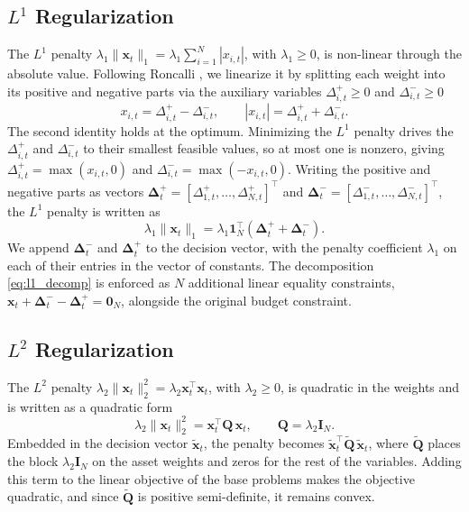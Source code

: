 \subsection{$L^1$ Regularization} \label{app:l1}

The $L^1$ penalty $\lambda_1 \|\bm{x}_t\|_1 = \lambda_1 \sum_{i=1}^N |x_{i,t}|$, with
$\lambda_1 \ge 0$, is non-linear through the absolute value. Following Roncalli \cite{roncalli2013introduction},
we linearize it by splitting each weight into its positive and negative parts via the
auxiliary variables $\Delta_{i,t}^+ \ge 0$ and $\Delta_{i,t}^- \ge 0$
\begin{equation} \label{eq:l1_decomp}
    x_{i,t} = \Delta_{i,t}^+ - \Delta_{i,t}^-,
    \qquad
    |x_{i,t}| = \Delta_{i,t}^+ + \Delta_{i,t}^-.
\end{equation}
The second identity holds at the optimum. Minimizing the $L^1$ penalty drives the $\Delta_{i,t}^+$ and $\Delta_{i,t}^-$ to
their smallest feasible values, so at most one is
nonzero, giving $\Delta_{i,t}^+ = \max(x_{i,t}, 0)$ and
$\Delta_{i,t}^- = \max(-x_{i,t}, 0)$. Writing the positive and negative parts as
vectors
$\bm{\Delta}_t^+ = [\Delta_{1,t}^+, \dots, \Delta_{N,t}^+]^\top$ and
$\bm{\Delta}_t^- = [\Delta_{1,t}^-, \dots, \Delta_{N,t}^-]^\top$, the $L^1$ penalty is written as
\begin{equation*}
    \lambda_1 \|\bm{x}_t\|_1 = \lambda_1 \bm{1}_N^\top (\bm{\Delta}_t^+ + \bm{\Delta}_t^-).
\end{equation*}
We append $\bm{\Delta}_t^-$ and $\bm{\Delta}_t^+$ to the decision vector, with the penalty coefficient $\lambda_1$ on
each of their entries in the vector of constants. The decomposition \eqref{eq:l1_decomp} is enforced as $N$ additional linear
equality constraints, $\bm{x}_t + \bm{\Delta}_t^- - \bm{\Delta}_t^+ = \bm{0}_N$, alongside the original budget
constraint.

\subsection{$L^2$ Regularization} \label{app:l2}

The $L^2$ penalty $\lambda_2 \|\bm{x}_t\|_2^2 = \lambda_2 \bm{x}_t^\top \bm{x}_t$, with
$\lambda_2 \ge 0$, is quadratic in the weights and is written as a quadratic form
\begin{equation*}
    \lambda_2 \|\bm{x}_t\|_2^2 = \bm{x}_t^\top \bm{Q}\, \bm{x}_t,
    \qquad \bm{Q} = \lambda_2 \bm{I}_N.
\end{equation*}
Embedded in the decision vector $\tilde{\bm{x}}_t$, the penalty becomes
$\tilde{\bm{x}}_t^\top \tilde{\bm{Q}}\, \tilde{\bm{x}}_t$, where $\tilde{\bm{Q}}$ places the
block $\lambda_2 \bm{I}_N$ on the asset weights and zeros for the rest of the variables. Adding this term to the linear
objective of the base problems makes the objective quadratic, and since $\tilde{\bm{Q}}$ is positive semi-definite, it
remains convex.

